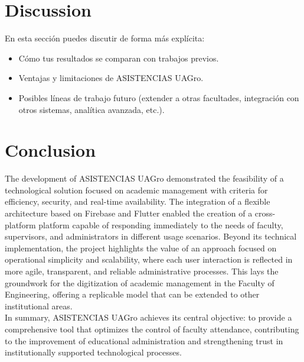 \documentclass[journal=information,article,submit,pdftex,oneauthor]{Definitions/mdpi}
\begin{document}
	\section{Discussion}
	
	En esta sección puedes discutir de forma más explícita:
	\begin{itemize}
		\item Cómo tus resultados se comparan con trabajos previos.
		\item Ventajas y limitaciones de ASISTENCIAS UAGro.
		\item Posibles líneas de trabajo futuro (extender a otras facultades, integración con otros sistemas, analítica avanzada, etc.).
	\end{itemize}
	
	
	
	\section{Conclusion}
	
	The development of ASISTENCIAS UAGro demonstrated the feasibility of a technological solution focused on academic management with criteria for efficiency, security, and real-time availability. The integration of a flexible architecture based on Firebase and Flutter enabled the creation of a cross-platform platform capable of responding immediately to the needs of faculty, supervisors, and administrators in different usage scenarios. Beyond its technical implementation, the project highlights the value of an approach focused on operational simplicity and scalability, where each user interaction is reflected in more agile, transparent, and reliable administrative processes. This lays the groundwork for the digitization of academic management in the Faculty of Engineering, offering a replicable model that can be extended to other institutional areas.\\
	
	In summary, ASISTENCIAS UAGro achieves its central objective: to provide a comprehensive tool that optimizes the control of faculty attendance, contributing to the improvement of educational administration and strengthening trust in institutionally supported technological processes.
	
\end{document}
